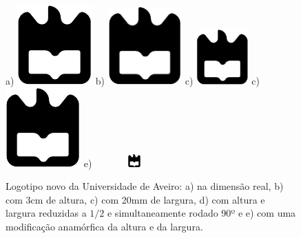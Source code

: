 \begin{figure}[h]
\center %
 a) \includegraphics{latex-intro/ua}
 b) \includegraphics[height=3cm]{latex-intro/ua}
 c) \includegraphics[width=20mm]{latex-intro/ua}
 c) \includegraphics[scale=.5,angle=90]{latex-intro/ua}
 e) \includegraphics[height=5mm,width=3cm]{latex-intro/ua}
\caption{Logotipo novo da Universidade de Aveiro: a) na dimensão real,
b) com 3cm de altura, c) com 20mm de largura, d) com altura e largura
reduzidas a $1/2$ e simultaneamente rodado 90º e e) com uma modificação
anamórfica da altura e da largura.}
\label{fig:ualogo.2}
\end{figure}


